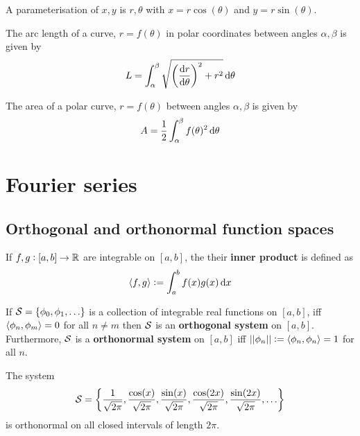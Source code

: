 \documentclass[../Year1/Year1.tex]{subfiles}
\begin{document}
\begin{definition}
    A parameterisation of $x,y$ is $r,\theta$ with $x=r\cos(\theta)$ and $y=r\sin(\theta)$.
\end{definition}

\begin{theorem}
    The arc length of a curve, $r=f(\theta)$ in polar coordinates between angles $\alpha,\beta$ is given by \[
        L = \intd{\alpha}{\beta}{\sqrt{\br{\frac{\dif r}{\dif \theta}}^2 + r^2}}{\theta}
    \]
\end{theorem}

\begin{theorem}
    The area of a polar curve, $r=f(\theta)$ between angles $\alpha,\beta$ is given by \[
        A = \frac{1}{2}\intd{\alpha}{\beta}{f(\theta)^2}{\theta}
    \]
\end{theorem}

\section{Fourier series}
\subsection{Orthogonal and orthonormal function spaces}

\begin{definition}
    If $f,g:[a,b]\rightarrow\mathbb{R}$ are integrable on $[a,b]$, the their \textbf{inner product} is defined as \[
        \abr{f,g} := \intd{a}{b}{f(x)g(x)}{x}
    \] 
\end{definition}

\begin{definition}
    If $\mathcal{S}=\{\phi_0,\phi_1,\ldots\}$ is a collection of integrable real functions on $[a,b]$, iff $\left\langle \phi_n,\phi_m \right\rangle=0$ for all $n\neq m$ then $\mathcal{S}$ is an \textbf{orthogonal system} on $[a,b]$. Furthermore, $\mathcal{S}$ is a \textbf{orthonormal system} on $[a,b]$ iff $||\phi_n||:=\left\langle \phi_n,\phi_n \right\rangle=1$ for all $n$.
\end{definition}

\begin{theorem}
    The system \[
        \mathcal{S} = \left\{ \frac{1}{\sqrt{2\pi}},\frac{\cos(x)}{\sqrt{2\pi}},\frac{\sin(x)}{\sqrt{2\pi}},\frac{\cos(2x)}{\sqrt{2\pi}},\frac{\sin(2x)}{\sqrt{2\pi}},\ldots\right\}
    \] is orthonormal on all closed intervals of length $2\pi$.
\end{theorem}
\end{document}
